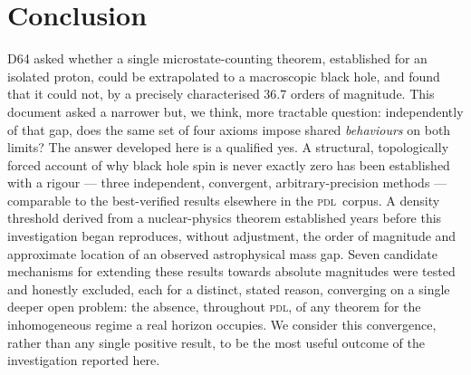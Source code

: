 \documentclass[12pt,a4paper]{article}
\newcommand{\PDL}{\textsc{pdl}}
\begin{document}
\section{Conclusion}
\label{sec:conclusion}

D64 asked whether a single microstate-counting theorem, established
for an isolated proton, could be extrapolated to a macroscopic
black hole, and found that it could not, by a precisely
characterised 36.7 orders of magnitude. This document asked a
narrower but, we think, more tractable question: independently of
that gap, does the same set of four axioms impose shared
\emph{behaviours} on both limits? The answer developed here is a
qualified yes. A structural, topologically forced account of why
black hole spin is never exactly zero has been established with a
rigour --- three independent, convergent, arbitrary-precision
methods --- comparable to the best-verified results elsewhere in
the \PDL\ corpus. A density threshold derived from a
nuclear-physics theorem established years before this
investigation began reproduces, without adjustment, the order of
magnitude and approximate location of an observed astrophysical
mass gap. Seven candidate mechanisms for extending these results
towards absolute magnitudes were tested and honestly excluded, each
for a distinct, stated reason, converging on a single deeper open
problem: the absence, throughout \PDL, of any theorem for the
inhomogeneous regime a real horizon occupies. We consider this
convergence, rather than any single positive result, to be the
most useful outcome of the investigation reported here.



\end{document}
